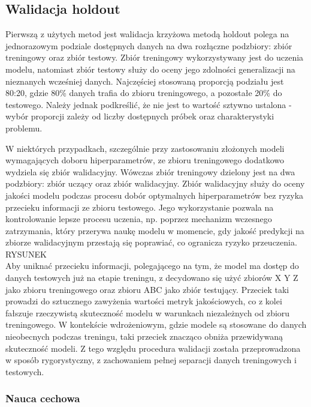 \documentclass[a4paper,twoside,12pt]{book}
\begin{document}
\subsection{Walidacja holdout}
Pierwszą z użytych metod jest walidacja krzyżowa metodą holdout polega na jednorazowym podziale dostępnych danych na dwa rozłączne podzbiory: zbiór treningowy oraz zbiór testowy. Zbiór treningowy wykorzystywany jest do uczenia modelu, natomiast zbiór testowy służy do oceny jego zdolności generalizacji na nieznanych wcześniej danych. Najczęściej stosowaną proporcją podziału jest 80:20, gdzie 80\% danych trafia do zbioru treningowego, a pozostałe 20\% do testowego. Należy jednak podkreślić, że nie jest to wartość sztywno ustalona - wybór proporcji zależy od liczby dostępnych próbek oraz charakterystyki problemu.

W niektórych przypadkach, szczególnie przy zastosowaniu złożonych modeli wymagających doboru hiperparametrów, ze zbioru treningowego dodatkowo wydziela się zbiór walidacyjny. Wówczas zbiór treningowy dzielony jest na dwa podzbiory: zbiór uczący oraz zbiór walidacyjny. Zbiór walidacyjny służy do oceny jakości modelu podczas procesu dobór optymalnych hiperparametrów bez ryzyka przecieku informacji ze zbioru testowego. Jego wykorzystanie pozwala na kontrolowanie lepsze procesu uczenia, np. poprzez mechanizm wczesnego zatrzymania, który przerywa naukę modelu w momencie, gdy jakość predykcji na zbiorze walidacyjnym przestają się poprawiać, co ogranicza ryzyko przeuczenia.\\

{\LARGE
RYSUNEK}\\

Aby uniknać przecieku informacji, polegającego na tym, że model ma dostęp do danych testowych już na etapie treningu, z decydowano się użyć zbiorów X Y Z jako zbioru treningowego oraz zbioru ABC jako zbiór testujący. Przeciek taki prowadzi do sztucznego zawyżenia wartości metryk jakościowych, co z kolei fałszuje rzeczywistą skuteczność modelu w warunkach niezależnych od zbioru treningowego. W kontekście wdrożeniowym, gdzie modele są stosowane do danych nieobecnych podczas treningu, taki przeciek znacząco obniża przewidywaną skuteczność modeli. Z tego względu procedura walidacji została przeprowadzona w sposób rygorystyczny, z zachowaniem pełnej separacji danych treningowych i testowych.


\subsubsection*{Nauca cechowa}
\end{document}

